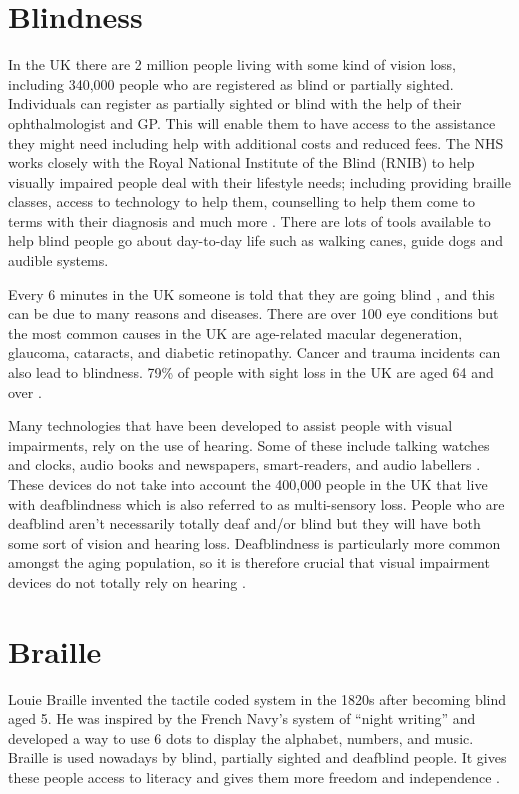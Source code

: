 \section{Blindness}
In the UK there are 2 million people living with some kind of vision loss, including 340,000 people who are registered as blind or partially sighted.
Individuals can register as partially sighted or blind with the help of their ophthalmologist and GP. This will enable them to have access to the assistance they might need including help with additional costs and reduced fees.
The NHS works closely with the Royal National Institute of the Blind (RNIB) to help visually impaired people deal with their lifestyle needs; including providing braille classes, access to technology to help them, counselling to help them come to terms with their diagnosis and much more \cite{national_health_system_england_blindness_2017,royal_national_institute_of_blind_people_key_nodate}.
There are lots of tools available to help blind people go about day-to-day life such as walking canes, guide dogs and audible systems.  

Every 6 minutes in the UK someone is told that they are going blind \cite{fight_for_sight_facts_nodate}, and this can be due to many reasons and diseases.
There are over 100 eye conditions but the most common causes in the UK are age-related macular degeneration, glaucoma, cataracts, and diabetic retinopathy.
Cancer and trauma incidents can also lead to blindness.
79\% of people with sight loss in the UK are aged 64 and over \cite{royal_national_institute_of_blind_people_key_nodate}.  

Many technologies that have been developed to assist people with visual impairments, rely on the use of hearing.
Some of these include talking watches and clocks, audio books and newspapers, smart-readers, and audio labellers \cite{royal_national_institute_of_blind_people_audio_nodate}. 
These devices do not take into account the 400,000 people in the UK that live with deafblindness which is also referred to as multi-sensory loss.
People who are deafblind aren't necessarily totally deaf and/or blind but they will have both some sort of vision and hearing loss.
Deafblindness is particularly more common amongst the aging population, so it is therefore crucial that visual impairment devices do not totally rely on hearing \cite{sense_deafblindness_nodate,deafblind_uk_what_nodate,national_health_system_england_deafblindness_2017}.  

\section{Braille}
Louie Braille invented the tactile coded system in the 1820s after becoming blind aged 5.
He was inspired by the French Navy's system of ``night writing'' and developed a way to use 6 dots to display the alphabet, numbers, and music.
Braille is used nowadays by blind, partially sighted and deafblind people.
It gives these people access to literacy and gives them more freedom and independence \cite{sight_scotland_who_nodate}.  

